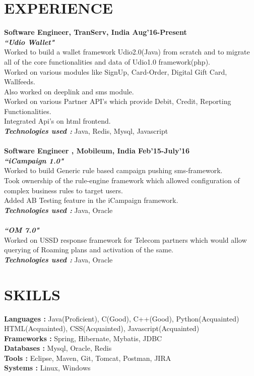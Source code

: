 \documentclass[line, margin]{res}
\begin{document}
\address{ +91 9833471993, surajtripathi793@gmail.com}
\begin{resume}

\section{EXPERIENCE} 
\textbf{Software Engineer, TranServ, India \hfill Aug'16-Present} \\
\textbf{\textit{``Udio Wallet"}} \\
Worked to build a wallet framework Udio2.0(Java) from scratch and to migrate all of the core functionalities and data of Udio1.0 framework(php). \\
Worked on various modules like SignUp, Card-Order, Digital Gift Card, Wallfeeds. \\
Also worked on deeplink and sms module. \\
Worked on various Partner API's which provide Debit, Credit, Reporting Functionalities.\\
Integrated Api's on html frontend. \\
\textbf{\textit{Technologies used : }} Java, Redis, Mysql, Javascript \\
\\
\textbf{Software Engineer , Mobileum, India \hfill Feb'15-July'16} \\
\textbf{\textit{``iCampaign 1.0"}} \\
Worked to build Generic rule based campaign pushing sms-framework.\\
Took ownership of the rule-engine framework which allowed configuration of complex business rules to target users. \\
Added AB Testing feature in the iCampaign framework.\\
\textbf{\textit{Technologies used : }} Java, Oracle \\
\\
\textbf{\textit{``OM 7.0"}} \\
Worked on USSD response framework for Telecom partners which would allow querying of Roaming plans and activation of the same.\\
\textbf{\textit{Technologies used : }} Java, Oracle \\

\section{SKILLS} 
\textbf{Languages : }Java(Proficient), C(Good), C++(Good), Python(Acquainted) \\HTML(Acquainted), CSS(Acquainted), Javascript(Acquainted) \\
\textbf{Frameworks : }Spring, Hibernate, Mybatis, JDBC \\
\textbf{Databases : }Mysql, Oracle, Redis \\
\textbf{Tools : }Eclipse, Maven, Git, Tomcat, Postman, JIRA \\
\textbf{Systems : }Linux, Windows


\end{resume}
\end{document}
